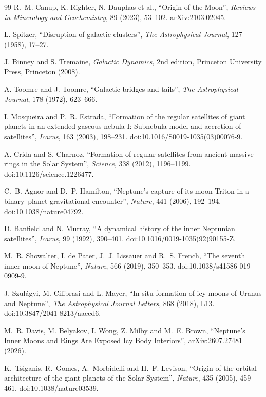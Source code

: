 \documentclass[11pt,a4paper,openany]{report}
\begin{document}
\begin{thebibliography}{99}
 R.~M. Canup, K. Righter, N. Dauphas et al., ``Origin of the Moon'',
\emph{Reviews in Mineralogy and Geochemistry}, 89 (2023), 53--102. arXiv:2103.02045.

 L. Spitzer, ``Disruption of galactic clusters'', \emph{The Astrophysical
Journal}, 127 (1958), 17--27.

 J. Binney and S. Tremaine, \emph{Galactic Dynamics}, 2nd edition,
Princeton University Press, Princeton (2008).

 A. Toomre and J. Toomre, ``Galactic bridges and tails'', \emph{The
Astrophysical Journal}, 178 (1972), 623--666.


 I. Mosqueira and P.~R. Estrada, ``Formation of the regular
satellites of giant planets in an extended gaseous nebula I: Subnebula model and accretion of
satellites'', \emph{Icarus}, 163 (2003), 198--231. doi:10.1016/S0019-1035(03)00076-9.

 A. Crida and S. Charnoz, ``Formation of regular satellites from ancient
massive rings in the Solar System'', \emph{Science}, 338 (2012), 1196--1199.
doi:10.1126/science.1226477.

 C.~B. Agnor and D.~P. Hamilton, ``Neptune's capture of its moon Triton
in a binary--planet gravitational encounter'', \emph{Nature}, 441 (2006), 192--194.
doi:10.1038/nature04792.

 D. Banfield and N. Murray, ``A dynamical history of the inner
Neptunian satellites'', \emph{Icarus}, 99 (1992), 390--401.
doi:10.1016/0019-1035(92)90155-Z.

 M.~R. Showalter, I. de Pater, J.~J. Lissauer and R.~S. French, ``The
seventh inner moon of Neptune'', \emph{Nature}, 566 (2019), 350--353.
doi:10.1038/s41586-019-0909-9.

 J. Szulágyi, M. Cilibrasi and L. Mayer, ``In situ formation of icy moons of
Uranus and Neptune'', \emph{The Astrophysical Journal Letters}, 868 (2018), L13.
doi:10.3847/2041-8213/aaeed6.

 M.~R. Davis, M. Belyakov, I. Wong, Z. Milby and M.~E. Brown, ``Neptune's Inner
Moons and Rings Are Exposed Icy Body Interiors'', arXiv:2607.27481 (2026).


 K.~Tsiganis, R.~Gomes, A.~Morbidelli and H.~F. Levison, ``Origin of the
orbital architecture of the giant planets of the Solar System'', \emph{Nature}, 435 (2005),
459--461. doi:10.1038/nature03539.


\end{thebibliography}
\end{document}

